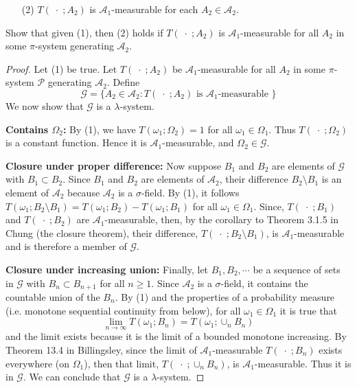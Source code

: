\documentclass[letterpaper, 12pt]{article}
\newcommand{\cA}{\mathcal{A}}
\newcommand{\sG}{\mathscr{G}}
\newcommand{\sP}{\mathscr{P}}
\begin{document}
\begin{enumerate}
\begin{enumerate}
\item[(2)] $T(\;\cdot\;;A_2)$ is $\cA_1$-measurable for each $A_2\in\cA_2$.
\end{enumerate} 

Show that given (1), then (2) holds if $T(\;\cdot\; ;A_2)$ is $\cA_1$-measurable for all $A_2$ in some $\pi$-system generating $\cA_2$.

\begin{proof}
Let (1) be true. Let $T(\;\cdot\; ;A_2)$ be $\cA_1$-measurable for all $A_2$ in some $\pi$-system $\sP$ generating $\cA_2$. 
Define 
\[
\sG = \{  A_2 \in \cA_2 : T( \;\cdot \;; A_2) \text{ is $\cA_1$-measurable }\}
\]
We now show that $\sG$ is a $\lambda$-system. 

\textbf{Contains $\Omega_2$:} 
By (1), we have $T(\omega_1; \Omega_2) = 1$ for all $\omega_1 \in \Omega_1$. 
Thus $T( \; \cdot \; ; \Omega_2)$ is a constant function. Hence it is $\cA_1$-measurable, and $\Omega_2 \in \sG$. 

\textbf{Closure under proper difference:} Now suppose $B_1$ and $B_2$ are elements of $\sG$ with $B_1 \subset B_2$. 
Since $B_1$ and $B_2$ are elements of $\cA_2$, their difference $B_2 \setminus B_1$ is an element of $\cA_2$ because $\cA_2$ is a $\sigma$-field.
By (1), it follows $T(\omega_1; B_2 \setminus B_1) = T(\omega_1; B_2) - T(\omega_1; B_1)$ for all $\omega_1 \in \Omega_1$. 
Since, $T( \; \cdot \; ; B_1)$ and $T( \; \cdot \; ; B_2)$ are $\cA_1$-measurable, then, by the corollary to Theorem 3.1.5 in Chung (the closure theorem), their difference, $T(\; \cdot\; ; B_2 \setminus B_1)$, is $\cA_1$-measurable and is therefore a member of $\sG$. 

\textbf{Closure under increasing union:} Finally, let $B_1, B_2, \cdots$ be a sequence of sets in $\sG$ with $B_n \subset B_{n+1}$ for all $n \geq 1$. 
Since $\cA_2$ is a $\sigma$-field, it contains the countable union of the $B_n$.
By (1) and the properties of a probability measure (i.e. monotone sequential continuity from below), for all $\omega_1 \in \Omega_1$ it is true that
\[
\lim_{n \to \infty} T(\omega_1; B_n) = T(\omega_1; \cup_n B_n)
\]
and the limit exists because it is the limit of a bounded monotone increasing.
By Theorem 13.4 in Billingsley, since the limit of $\cA_1$-measurable $T(\; \cdot \; ; B_n)$ exists everywhere (on $\Omega_1$), then that limit, $T(\; \cdot \; ; \cup_n B_n)$, is $\cA_1$-measurable. 
Thus it is in $\sG$. We can conclude that $\sG$ is a $\lambda$-system.


\end{proof}
\end{enumerate}
\end{document}

